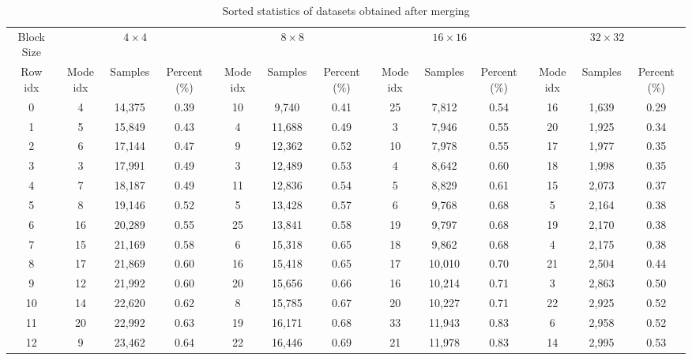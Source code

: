 \begin{table}[H]
    \caption{Sorted statistics of datasets obtained after merging}
    \bigskip\label{tab:sorted-distribution-after-first-step}
    \centering
    \resizebox{\textwidth}{!}
    {\begin{tabular}{c c c c c c c c c c c c c}
        \toprule
        Block Size & \multicolumn{3}{c}{\(4\times4\)} & \multicolumn{3}{c}{\(8\times8\)} & \multicolumn{3}{c}{\(16\times16\)} & \multicolumn{3}{c}{\(32\times32\)} \\
        Row idx  & Mode idx & Samples & Percent (\%) & Mode idx & Samples & Percent (\%) & Mode idx & Samples & Percent (\%) & Mode idx & Samples & Percent (\%)\\
        \midrule
        0 & 4  & 14,375 &  0.39 & 10  & 9,740 &  0.41 & 25  & 7,812 &  0.54 & 16  & 1,639 &  0.29 \\ 
        1 & 5  & 15,849 &  0.43 & 4  & 11,688 &  0.49 & 3  & 7,946 &  0.55 & 20  & 1,925 &  0.34 \\ 
        2 & 6  & 17,144 &  0.47 & 9  & 12,362 &  0.52 & 10  & 7,978 &  0.55 & 17  & 1,977 &  0.35 \\ 
        3 & 3  & 17,991 &  0.49 & 3  & 12,489 &  0.53 & 4  & 8,642 &  0.60 & 18  & 1,998 &  0.35 \\ 
        4 & 7  & 18,187 &  0.49 & 11  & 12,836 &  0.54 & 5  & 8,829 &  0.61 & 15  & 2,073 &  0.37 \\ 
        5 & 8  & 19,146 &  0.52 & 5  & 13,428 &  0.57 & 6  & 9,768 &  0.68 & 5  & 2,164 &  0.38 \\ 
        6 & 16  & 20,289 &  0.55 & 25  & 13,841 &  0.58 & 19  & 9,797 &  0.68 & 19  & 2,170 &  0.38 \\ 
        7 & 15  & 21,169 &  0.58 & 6  & 15,318 &  0.65 & 18  & 9,862 &  0.68 & 4  & 2,175 &  0.38 \\ 
        8 & 17  & 21,869 &  0.60 & 16  & 15,418 &  0.65 & 17  & 10,010 &  0.70 & 21  & 2,504 &  0.44 \\ 
        9 & 12  & 21,992 &  0.60 & 20  & 15,656 &  0.66 & 16  & 10,214 &  0.71 & 3  & 2,863 &  0.50 \\ 
       10 & 14  & 22,620 &  0.62 & 8  & 15,785 &  0.67 & 20  & 10,227 &  0.71 & 22  & 2,925 &  0.52 \\ 
       11 & 20  & 22,992 &  0.63 & 19  & 16,171 &  0.68 & 33  & 11,943 &  0.83 & 6  & 2,958 &  0.52 \\ 
       12 & 9  & 23,462 &  0.64 & 22  & 16,446 &  0.69 & 21  & 11,978 &  0.83 & 14  & 2,995 &  0.53 \\ 

\end{tabular}}
\end{table}
